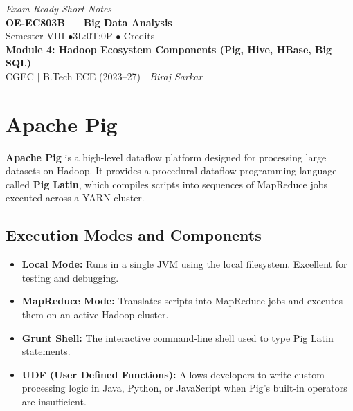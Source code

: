 \documentclass[12pt,a4paper]{article}
\begin{document}
\begin{center}
  \hfill \textit{Exam-Ready Short Notes} \\
  \vspace{6pt}
  {\LARGE\bfseries\color{myred} OE-EC803B --- Big Data Analysis}\\[5pt]
  {\normalsize\color{mydark} Semester VIII \quad$\bullet$\quad 3L:0T:0P \quad$\bullet$ Credits}\\[3pt]
  {\normalsize\color{myteal}\textbf{Module 4: Hadoop Ecosystem Components (Pig, Hive, HBase, Big SQL)}}\\[3pt]
  {\small\color{mydark} CGEC \;$|$\; B.Tech ECE (2023--27) \;$|$\; \textit{Biraj Sarkar}}
\end{center}
\vspace{2pt}
\noindent{\color{myred}\rule{\linewidth}{1.5pt}}
\vspace{2pt}

\hypersetup{linkcolor=mydark}
\tableofcontents
\hypersetup{linkcolor=myteal}
\newpage

\section{Apache Pig}

\begin{tcolorbox}[defbox, title={Apache Pig}]
  \textbf{Apache Pig} is a high-level dataflow platform designed for processing large datasets on Hadoop. It provides a procedural dataflow programming language called \textbf{Pig Latin}, which compiles scripts into sequences of MapReduce jobs executed across a YARN cluster.
\end{tcolorbox}

\subsection{Execution Modes and Components}
\begin{itemize}[leftmargin=*, itemsep=3pt]
  \item \textbf{Local Mode:} Runs in a single JVM using the local filesystem. Excellent for testing and debugging.
  \item \textbf{MapReduce Mode:} Translates scripts into MapReduce jobs and executes them on an active Hadoop cluster.
  \item \textbf{Grunt Shell:} The interactive command-line shell used to type Pig Latin statements.
  \item \textbf{UDF (User Defined Functions):} Allows developers to write custom processing logic in Java, Python, or JavaScript when Pig's built-in operators are insufficient.
\end{itemize}
\end{document}
